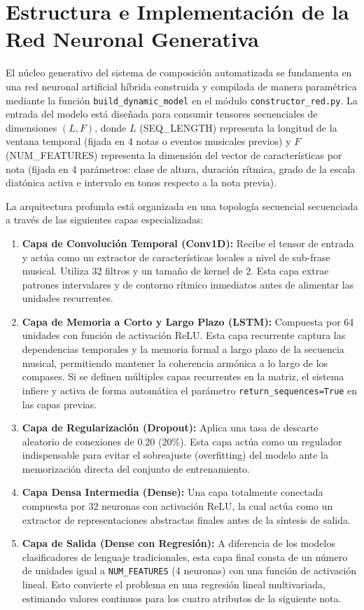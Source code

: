\section{Estructura e Implementación de la Red Neuronal Generativa}

El núcleo generativo del sistema de composición automatizada se fundamenta en una red neuronal artificial híbrida construida y compilada de manera paramétrica mediante la función \texttt{build\_dynamic\_model} en el módulo \texttt{constructor\_red.py}. La entrada del modelo está diseñada para consumir tensores secuenciales de dimensiones $(L, F)$, donde $L$ (SEQ\_LENGTH) representa la longitud de la ventana temporal (fijada en 4 notas o eventos musicales previos) y $F$ (NUM\_FEATURES) representa la dimensión del vector de características por nota (fijada en 4 parámetros: clase de altura, duración rítmica, grado de la escala diatónica activa e intervalo en tonos respecto a la nota previa).

La arquitectura profunda está organizada en una topología secuencial secuenciada a través de las siguientes capas especializadas:
\begin{enumerate}
    \item \textbf{Capa de Convolución Temporal (Conv1D):} Recibe el tensor de entrada y actúa como un extractor de características locales a nivel de sub-frase musical. Utiliza 32 filtros y un tamaño de kernel de 2. Esta capa extrae patrones intervalares y de contorno rítmico inmediatos antes de alimentar las unidades recurrentes.
    \item \textbf{Capa de Memoria a Corto y Largo Plazo (LSTM):} Compuesta por 64 unidades con función de activación ReLU. Esta capa recurrente captura las dependencias temporales y la memoria formal a largo plazo de la secuencia musical, permitiendo mantener la coherencia armónica a lo largo de los compases. Si se definen múltiples capas recurrentes en la matriz, el sistema infiere y activa de forma automática el parámetro \texttt{return\_sequences=True} en las capas previas.
    \item \textbf{Capa de Regularización (Dropout):} Aplica una tasa de descarte aleatorio de conexiones de $0.20$ ($20\%$). Esta capa actúa como un regulador indispensable para evitar el sobreajuste (overfitting) del modelo ante la memorización directa del conjunto de entrenamiento.
    \item \textbf{Capa Densa Intermedia (Dense):} Una capa totalmente conectada compuesta por 32 neuronas con activación ReLU, la cual actúa como un extractor de representaciones abstractas finales antes de la síntesis de salida.
    \item \textbf{Capa de Salida (Dense con Regresión):} A diferencia de los modelos clasificadores de lenguaje tradicionales, esta capa final consta de un número de unidades igual a \texttt{NUM\_FEATURES} (4 neuronas) con una función de activación lineal. Esto convierte el problema en una regresión lineal multivariada, estimando valores continuos para los cuatro atributos de la siguiente nota.
\end{enumerate}

